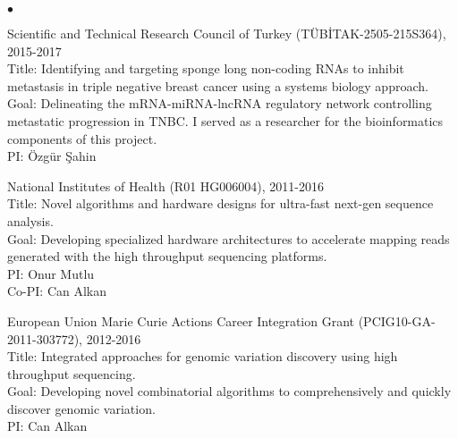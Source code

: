 \documentclass[margin,line]{res}
\newenvironment{list2}{
  \begin{list}{$\bullet$}{%
      \setlength{\itemsep}{0.1cm}
      \setlength{\parsep}{0in} \setlength{\parskip}{0in}
      \setlength{\topsep}{0in} \setlength{\partopsep}{0in} 
      \setlength{\leftmargin}{0.2in}}}{\end{list}}
\begin{document}
\begin{resume}
\begin{list2}
                                       \item
                                         Scientific and Technical Research Council of Turkey (T\"{U}B\.{I}TAK-2505-215S364), 2015-2017\\
                                         Title: Identifying and targeting sponge long non-coding RNAs to inhibit metastasis in triple negative breast cancer
                                         using a systems biology approach.\\
                                         Goal: Delineating the mRNA-miRNA-lncRNA regulatory network controlling metastatic progression in TNBC. I served as a researcher
                                         for the bioinformatics components of this project.\\
                                         PI: Özgür Şahin
                                       \item
                                         National Institutes of Health (R01 HG006004), 2011-2016\\
                                         Title: Novel algorithms and hardware designs for ultra-fast next-gen sequence analysis.\\
                                         Goal: Developing specialized hardware architectures to accelerate mapping reads generated with the high throughput sequencing platforms.\\
                                         PI: Onur Mutlu\\
                                         Co-PI: Can Alkan

                                       \item
                                         European Union Marie Curie Actions Career Integration Grant (PCIG10-GA-2011-303772),  2012-2016\\
                                         Title: Integrated approaches for genomic variation discovery using high throughput sequencing.\\
                                         Goal: Developing novel combinatorial algorithms to comprehensively and quickly discover genomic variation.\\
                                         PI: Can Alkan


\end{list2}
\end{resume}
\end{document}

